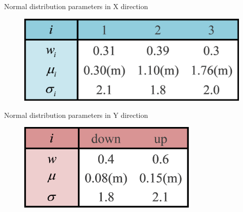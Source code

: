 \documentclass[12pt]{article}  %
\numberwithin{equation}{section} %
\begin{document}
\vspace{-2em}
\begin{minipage}[t]{0.5\linewidth}%
        \begin{table}[H]
    	    \centering
            \caption{\centering Normal distribution parameters in X direction}
            \vspace{-1em}
            \begin{figure}[H]
        	\centering
        	\includegraphics[width=1\textwidth]{X_TABLE.png}
        \end{figure}
        \label{X_TABLE}%
        \end{table}
    \end{minipage}%
    \begin{minipage}[t]{0.5\linewidth}%
        \begin{table}[H]
    	    \centering
            \caption{\centering Normal distribution parameters in Y direction}
            \vspace{-1em}
            \begin{figure}[H]
        	\centering
        	\includegraphics[width=0.77\textwidth]{Y_TABLE.png}
        \end{figure}
        \label{Y_TABLE}%
        \end{table}
         \vspace{-2em}
    \end{minipage}\par %
\end{document}
